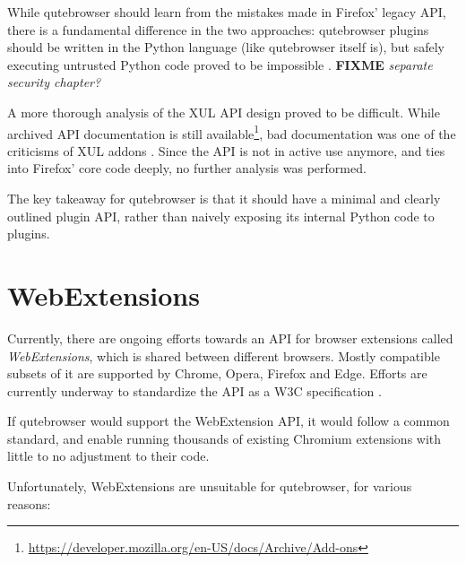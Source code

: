 \documentclass[a4paper,parskip=full]{scrreprt}
\newcommand{\fixme}[1]{\textbf{FIXME} \emph{#1}}
\begin{document}
While qutebrowser should learn from the mistakes made in Firefox' legacy API,
there is a fundamental difference in the two approaches: qutebrowser plugins
should be written in the Python language (like qutebrowser itself is), but
safely executing untrusted Python code proved to be impossible
\citep{nedbat-eval, lwn-pysandbox}. \fixme{separate security chapter?}

A more thorough analysis of the XUL API design proved to be difficult. While
archived API documentation is still
available\footnote{\url{https://developer.mozilla.org/en-US/docs/Archive/Add-ons}},
bad documentation was one of the criticisms of XUL addons
\citep{mozilla-webext}. Since the API is not in active use anymore, and ties
into Firefox' core code deeply, no further analysis was performed.

The key takeaway for qutebrowser is that it should have a minimal and clearly
outlined plugin API, rather than naively exposing its internal Python code to
plugins.

\section{WebExtensions}

Currently, there are ongoing efforts towards an API for browser
extensions called \emph{WebExtensions}, which is shared between different
browsers. Mostly compatible subsets of it are supported by Chrome, Opera,
Firefox and Edge. Efforts are currently underway to standardize the API
as a W3C specification \citep{w3c-webext}.

If qutebrowser would support the WebExtension API, it would follow a common
standard, and enable running thousands of existing Chromium extensions with
little to no adjustment to their code.

Unfortunately, WebExtensions are unsuitable for qutebrowser, for various
reasons:
\end{document}

